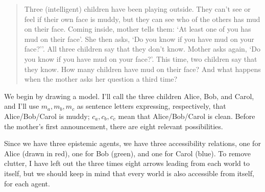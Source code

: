 \begin{quote}
  Three (intelligent) children have been playing outside. They can't see or feel
  if their own face is muddy, but they can see who of the others has mud on
  their face. Coming inside, mother tells them: `At least one of you has mud on
  their face'. She then asks, `Do you know if you have mud on your face?''.
  All three children say that they don't know. Mother asks again, `Do you know
  if you have mud on your face?'. This time, two children say that they know.
  How many children have mud on their face? And what happens when the mother
  asks her question a third time?
\end{quote}

We begin by drawing a model. I'll call the three children Alice, Bob, and Carol,
and I'll use $m_a, m_b, m_c$ as sentence letters expressing, respectively, that
Alice/Bob/Carol is muddy; $c_a, c_b, c_c$ mean that Alice/Bob/Carol is clean.
Before the mother's first announcement, there are eight relevant possibilities.

\begin{center}
\end{center}
%
Since we have three epistemic agents, we have three accessibility relations, one
for Alice (drawn in red), one for Bob (green), and one for Carol (blue). To
remove clutter, I have left out the three times eight arrows leading from each
world to itself, but we should keep in mind that every world is also accessible
from itself, for each agent.

